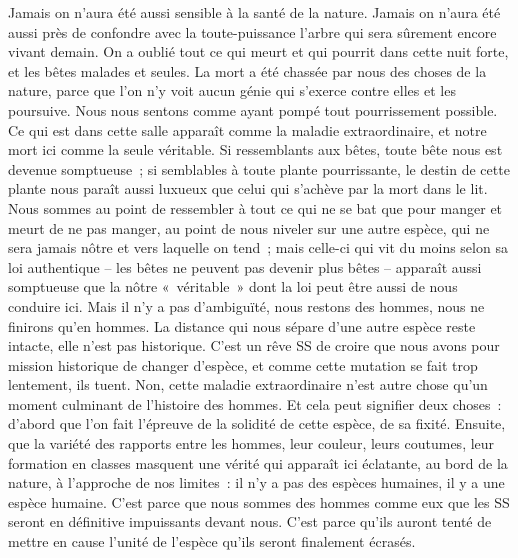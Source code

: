 {Jamais on n'aura été aussi sensible à la santé de la nature. Jamais on
n'aura été aussi près de confondre avec la toute-puissance l'arbre
qui sera sûrement encore vivant demain. On a oublié tout ce qui meurt
et qui pourrit dans cette nuit forte, et les bêtes malades et seules.
La mort a été chassée par nous des choses de la nature, parce que
l'on n'y voit aucun génie qui s'exerce contre elles et les poursuive.
Nous nous sentons comme ayant pompé tout pourrissement possible. Ce
qui est dans cette salle apparaît comme la maladie extraordinaire, et
notre mort ici comme la seule véritable. Si ressemblants aux bêtes,
toute bête nous est devenue somptueuse~; si semblables à toute plante
pourrissante, le destin de cette plante nous paraît aussi luxueux que
celui qui s'achève par la mort dans le lit. Nous sommes au point de
ressembler à tout ce qui ne se bat que pour manger et meurt de ne pas
manger, au point de nous niveler sur une autre espèce, qui ne sera
jamais nôtre et vers laquelle on tend~; mais celle-ci qui vit du
moins selon sa loi authentique – les bêtes ne peuvent pas devenir
plus bêtes – apparaît aussi somptueuse que la nôtre «~véritable~»
dont la loi peut être aussi de nous conduire ici. Mais il n'y a pas
d'ambiguïté, nous restons des hommes, nous ne finirons qu'en hommes.
La distance qui nous sépare d'une autre espèce reste intacte, elle
n'est pas historique. C'est un rêve SS de croire que nous avons pour
mission historique de changer d'espèce, et comme cette mutation se
fait trop lentement, ils tuent. Non, cette maladie extraordinaire
n'est autre chose qu'un moment culminant de l'histoire des hommes. Et
cela peut signifier deux choses~: d'abord que l'on fait l'épreuve de
la solidité de cette espèce, de sa fixité. Ensuite, que la variété
des rapports entre les hommes, leur couleur, leurs coutumes, leur
formation en classes masquent une vérité qui apparaît ici éclatante,
au bord de la nature, à l'approche de nos limites~: il n'y a pas des
espèces humaines, il y a une espèce humaine. C'est parce que nous
sommes des hommes comme eux que les SS seront en définitive
impuissants devant nous. C'est parce qu'ils auront tenté de mettre en
cause l'unité de l'espèce qu'ils seront finalement écrasés.
}



